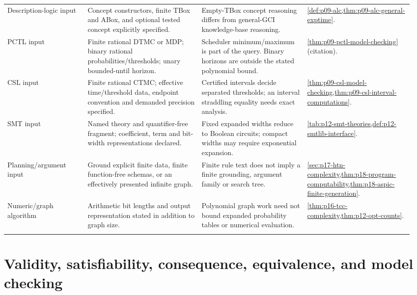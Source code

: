\begin{landscape}
\begin{longtable}{@{}p{0.19\linewidth}p{0.27\linewidth}p{0.25\linewidth}p{0.25\linewidth}@{}}
Description-logic input & Concept constructors, finite TBox and ABox, and optional tested concept explicitly specified. & Empty-TBox concept reasoning differs from general-GCI knowledge-base reasoning. & \cref{def:p09-alc,thm:p09-alc-general-exptime}.\\\addlinespace
PCTL input & Finite rational DTMC or MDP; binary rational probabilities/thresholds; unary bounded-until horizon. & Scheduler minimum/maximum is part of the query. Binary horizons are outside the stated polynomial bound. & \cref{thm:p09-pctl-model-checking} (citation).\\\addlinespace
CSL input & Finite rational CTMC; effective time/threshold data, endpoint convention and demanded precision specified. & Certified intervals decide separated thresholds; an interval straddling equality needs exact analysis. & \cref{thm:p09-csl-model-checking,thm:p09-csl-interval-computations}.\\\addlinespace
SMT input & Named theory and quantifier-free fragment; coefficient, term and bit-width representations declared. & Fixed expanded widths reduce to Boolean circuits; compact widths may require exponential expansion. & \cref{tab:p12-smt-theories,def:p12-smtlib-interface}.\\\addlinespace
Planning/argument input & Ground explicit finite data, finite function-free schemas, or an effectively presented infinite graph. & Finite rule text does not imply a finite grounding, argument family or search tree. & \cref{sec:p17-htn-complexity,thm:p18-program-computability,thm:p18-aspic-finite-generation}.\\\addlinespace
Numeric/graph algorithm & Arithmetic bit lengths and output representation stated in addition to graph size. & Polynomial graph work need not bound expanded probability tables or numerical evaluation. & \cref{thm:p16-tcc-complexity,thm:p12-opt-counts}.\\\addlinespace
\end{longtable}
\endgroup
\end{landscape}

\section{Validity, satisfiability, consequence, equivalence, and model checking}
\label{sec:p14-dc-problems}


